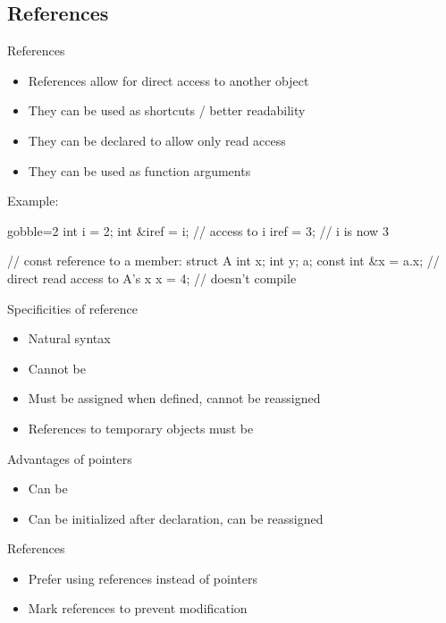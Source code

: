 \subsection[Refs]{References}

\begin{frame}[fragile]
  \begin{block}{References}
    \begin{itemize}
      \item References allow for direct access to another object
      \item They can be used as shortcuts / better readability
      \item They can be declared  to allow only read access
      \item They can be used as function arguments
    \end{itemize}
  \end{block}

  \begin{exampleblock}{Example:}
    \begin{cppcode*}{gobble=2}
      int i = 2;
      int &iref = i; // access to i
      iref = 3;      // i is now 3

      // const reference to a member:
      struct A { int x; int y; } a;
      const int &x = a.x; // direct read access to A's x
      x = 4;              // doesn't compile
    \end{cppcode*}
  \end{exampleblock}
\end{frame}

\begin{frame}[fragile]
  \begin{block}{Specificities of reference}
    \begin{itemize}
    \item Natural syntax
    \item Cannot be 
    \item Must be assigned when defined, cannot be reassigned
    \item References to temporary objects must be 
    \end{itemize}
  \end{block}
  \begin{block}{Advantages of pointers}
    \begin{itemize}
    \item Can be 
    \item Can be initialized after declaration, can be reassigned
    \end{itemize}
  \end{block}
  \pause
  \begin{goodpractice}{References}
    \begin{itemize}
      \item Prefer using references instead of pointers
      \item Mark references  to prevent modification
    \end{itemize}
  \end{goodpractice}
\end{frame}
